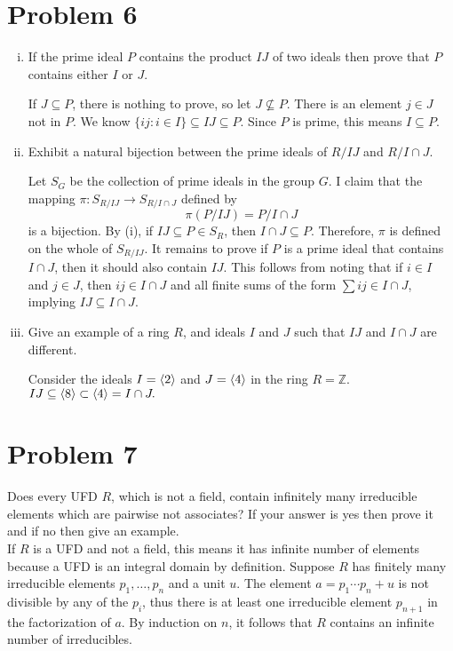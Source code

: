 \documentclass[12pt]{article}
\begin{document}
\section*{Problem 6}
\begin{enumerate}[(i)]
    \item If the prime ideal $P$ contains the product $IJ$ of two ideals then prove that $P$ contains either $I$ or $J$.
    
    If $J \subseteq P$, there is nothing to prove, so let $J \nsubseteq P$. There is an element $j \in J$ not in $P$. We know $\{ij : i \in I\} \subseteq IJ \subseteq P$. Since $P$ is prime, this means $I \subseteq P.$ 
    \item Exhibit a natural bijection between the prime ideals of $R/IJ$ and $R/I \cap J$.

    Let $S_G$ be the collection of prime ideals in the group $G$. I claim that the mapping $\pi: S_{R/IJ} \to S_{R/I\cap J}$ defined by
    $$\pi(P/IJ) = P/I\cap J$$
    is a bijection. By (i), if $IJ \subseteq P \in S_{R}$, then $I \cap J \subseteq P.$ Therefore, $\pi$ is defined on the whole of $S_{R/IJ}.$ It remains to prove if $P$ is a prime ideal that contains $I \cap J$, then it should also contain $IJ$. This follows from noting that if $i \in I$ and $j \in J$, then $ij \in I \cap J$ and all finite sums of the form $\sum ij \in I \cap J$, implying $IJ \subseteq I \cap J$.
    \item Give an example of a ring $R$, and ideals $I$ and $J$ such that $IJ$ and $I \cap J$ are different.

    Consider the ideals $I =  \langle 2 \rangle$ and $J = \langle 4 \rangle$ in the ring $R = \mathbb{Z}.$ $IJ \subseteq \langle 8 \rangle \subset \langle 4 \rangle = I \cap J.$
\end{enumerate}

\section*{Problem 7}

Does every UFD $R$, which is not a field, contain infinitely many irreducible elements which are pairwise not associates? If your answer is yes then prove it and if no then give an example.\\ 


\noindent If $R$ is a UFD and not a field, this means it has infinite number of elements because a UFD is an integral domain by definition. Suppose $R$ has finitely many irreducible elements $p_1,  \dots, p_n$ and a unit $u$. The element $a = p_1 \cdots p_n + u$ is not divisible by any of the $p_i$, thus there is at least one irreducible element $p_{n+1}$ in the factorization of $a$.  By induction on $n$, it follows that $R$ contains an infinite number of irreducibles.
\end{document}

